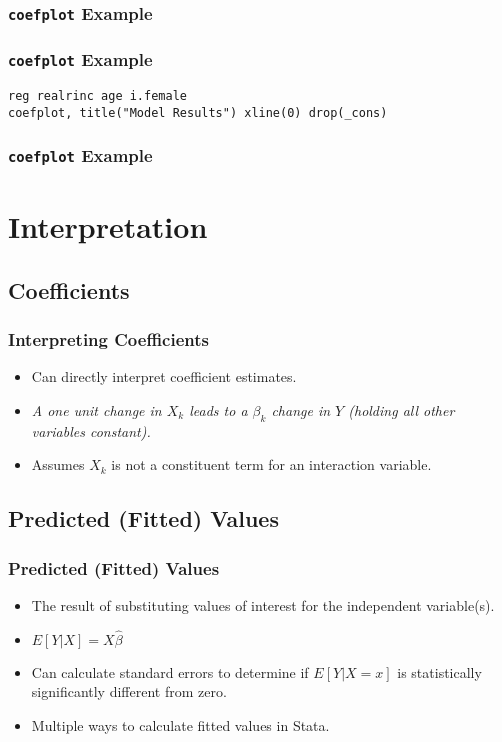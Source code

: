 \documentclass{beamer}
\begin{document}
\begin{frame}
	\frametitle{\texttt{coefplot} Example}
\end{frame}

\begin{frame}
	\frametitle{\texttt{coefplot} Example}
		\texttt{reg realrinc age i.female}\\
		\texttt{coefplot, title("Model Results") xline(0) drop(\_cons)}
\end{frame}

\begin{frame}
	\frametitle{\texttt{coefplot} Example}
\end{frame}

\section{Interpretation}
\subsection{Coefficients}

\begin{frame}
	\frametitle{Interpreting Coefficients}
		\begin{itemize}
			\item Can directly interpret coefficient estimates.
			\item \textit{A one unit change in $X_{k}$ leads to a $\beta_{k}$ change in $Y$ (holding all other variables constant).}
			\item Assumes $X_{k}$ is not a constituent term for an interaction variable. 
		\end{itemize}
\end{frame}

\subsection{Predicted (Fitted) Values}

\begin{frame}
	\frametitle{Predicted (Fitted) Values}
		\begin{itemize}
			\item The result of substituting values of interest for the independent variable(s).
			\item $E[Y|X]=X\hat{\beta}$
			\item Can calculate standard errors to determine if $E[Y|X=x]$ is statistically significantly different from zero.
			\item Multiple ways to calculate fitted values in Stata.
		\end{itemize}
\end{frame}
\end{document}
